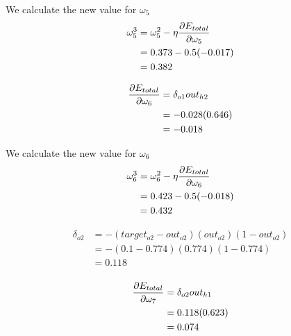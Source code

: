 \documentclass[10pt,a4paper]{article}
\begin{document}
We calculate the new value for $\omega_5$
\begin{equation}
\begin{split}
\omega_5^3 &= \omega_5^2 - \eta\pdv{E_{total}}{\omega_5}\\
           &= 0.373 -0.5(-0.017)\\
           &= 0.382\\
\end{split}
\end{equation}

\begin{equation}
\begin{split}
\pdv{E_{total}}{\omega_6} &= \delta_{o1}out_{h2}\\
                          &= -0.028(0.646)\\
                          &= -0.018\\
\end{split}
\end{equation}

We calculate the new value for $\omega_6$
\begin{equation}
\begin{split}
\omega_6^3 &= \omega_6^2 - \eta\pdv{E_{total}}{\omega_6}\\
           &= 0.423 -0.5(-0.018)\\
           &= 0.432\\
\end{split}
\end{equation}

\begin{equation}
\begin{split}
\delta_{o2} &= -(target_{o2} -out_{o2})(out_{o2})(1-out_{o2})\\
            &= -(0.1-0.774)(0.774)(1-0.774)\\
            &= 0.118\\
\end{split}
\end{equation}

\begin{equation}
\begin{split}
\pdv{E_{total}}{\omega_7} &= \delta_{o2}out_{h1}\\
                          &= 0.118(0.623)\\
                          &= 0.074\\
\end{split}
\end{equation}
\end{document}
